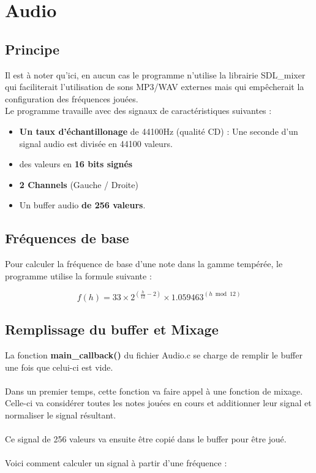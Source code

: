 \documentclass[12pt]{report}
\begin{document}
\newpage
\section{Audio}
\subsection{Principe}
Il est à noter qu'ici, en aucun cas le programme n'utilise la librairie SDL\_mixer qui faciliterait l'utilisation de
sons MP3/WAV externes mais qui empêcherait la configuration des fréquences jouées.\\
Le programme travaille avec des signaux de caractéristiques suivantes :\\
\begin{itemize}
 \item \textbf{Un taux d'échantillonage} de 44100Hz (qualité CD) : Une seconde d'un signal audio est divisée en 44100 valeurs.\\
 \item des valeurs en \textbf{16 bits signés} \\
 \item \textbf{2 Channels} (Gauche / Droite)\\
 \item Un buffer audio \textbf{de 256 valeurs}. \\
\end{itemize}

\subsection{Fréquences de base}
Pour calculer la fréquence de base d'une note dans la gamme tempérée, le programme utilise la formule suivante :\\
\begin{large}
\[ 
  f(h) = 33 \times {2}^{(\frac{h}{12} - 2)} \times {1.059463}^{(h \bmod 12)}
\]
\end{large}

\subsection{Remplissage du buffer et Mixage}
La fonction \textbf{main\_callback()} du fichier Audio.c se charge de remplir le buffer une fois que celui-ci est vide.\\ \\
Dans un premier temps, cette fonction va faire appel à une fonction de mixage.\\ Celle-ci va considérer toutes les notes
jouées en cours et additionner leur signal et normaliser le signal résultant.\\ \\ Ce signal de 256 valeurs va ensuite être
copié dans le buffer pour être joué.\\\\
Voici comment calculer un signal à partir d'une fréquence :\\
\end{document}
